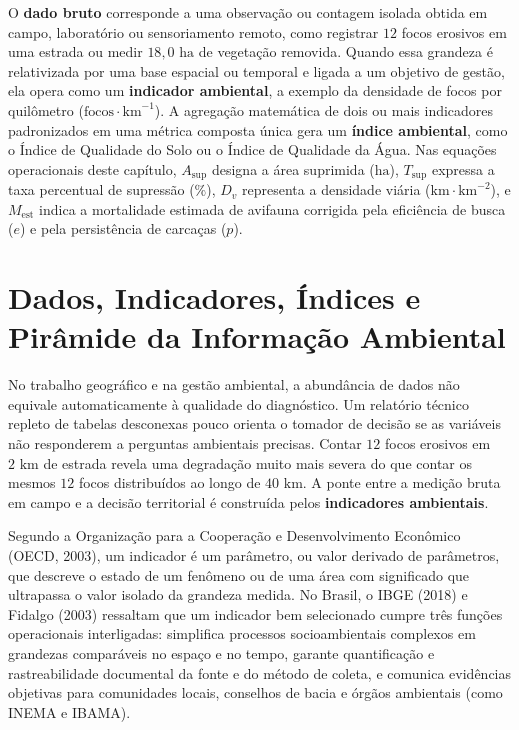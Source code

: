 
\begin{boxSimbolo}
O \textbf{dado bruto} corresponde a uma observação ou contagem isolada obtida em campo, laboratório ou sensoriamento remoto, como registrar $12$ focos erosivos em uma estrada ou medir $18{,}0\text{ ha}$ de vegetação removida. Quando essa grandeza é relativizada por uma base espacial ou temporal e ligada a um objetivo de gestão, ela opera como um \textbf{indicador ambiental}, a exemplo da densidade de focos por quilômetro ($\text{focos}\cdot\text{km}^{-1}$). A agregação matemática de dois ou mais indicadores padronizados em uma métrica composta única gera um \textbf{índice ambiental}, como o Índice de Qualidade do Solo ou o Índice de Qualidade da Água. Nas equações operacionais deste capítulo, $A_{\text{sup}}$ designa a área suprimida ($\text{ha}$), $T_{\text{sup}}$ expressa a taxa percentual de supressão ($\%$), $D_v$ representa a densidade viária ($\text{km}\cdot\text{km}^{-2}$), e $M_{\text{est}}$ indica a mortalidade estimada de avifauna corrigida pela eficiência de busca ($e$) e pela persistência de carcaças ($p$).
\end{boxSimbolo}

\section{Dados, Indicadores, Índices e Pirâmide da Informação Ambiental}

No trabalho geográfico e na gestão ambiental, a abundância de dados não equivale automaticamente à qualidade do diagnóstico. Um relatório técnico repleto de tabelas desconexas pouco orienta o tomador de decisão se as variáveis não responderem a perguntas ambientais precisas. Contar $12$ focos erosivos em $2\text{ km}$ de estrada revela uma degradação muito mais severa do que contar os mesmos $12$ focos distribuídos ao longo de $40\text{ km}$. A ponte entre a medição bruta em campo e a decisão territorial é construída pelos \textbf{indicadores ambientais}.

Segundo a Organização para a Cooperação e Desenvolvimento Econômico (OECD, 2003), um indicador é um parâmetro, ou valor derivado de parâmetros, que descreve o estado de um fenômeno ou de uma área com significado que ultrapassa o valor isolado da grandeza medida. No Brasil, o IBGE (2018) e Fidalgo (2003) ressaltam que um indicador bem selecionado cumpre três funções operacionais interligadas: simplifica processos socioambientais complexos em grandezas comparáveis no espaço e no tempo, garante quantificação e rastreabilidade documental da fonte e do método de coleta, e comunica evidências objetivas para comunidades locais, conselhos de bacia e órgãos ambientais (como INEMA e IBAMA).

